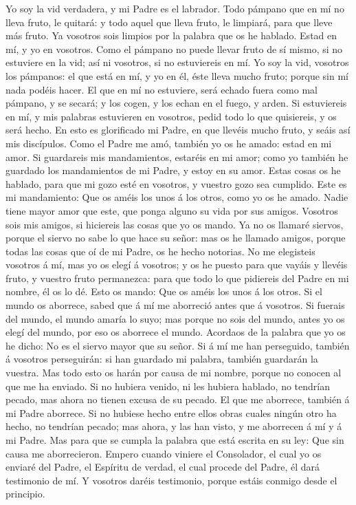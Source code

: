  Yo soy la vid verdadera, y mi Padre es el labrador.
 Todo pámpano que en mí no lleva fruto, le quitará: y todo
aquel que lleva fruto, le limpiará, para que lleve más fruto.
 Ya vosotros sois limpios por la palabra que os he
hablado.  Estad en mí, y yo en vosotros. Como el pámpano
no puede llevar fruto de sí mismo, si no estuviere en la vid; así ni
vosotros, si no estuviereis en mí.  Yo soy la vid,
vosotros los pámpanos: el que está en mí, y yo en él, éste lleva mucho
fruto; porque sin mí nada podéis hacer.  El que en mí no
estuviere, será echado fuera como mal pámpano, y se secará; y los cogen,
y los echan en el fuego, y arden.  Si estuviereis en mí, y
mis palabras estuvieren en vosotros, pedid todo lo que quisiereis, y os
será hecho.  En esto es glorificado mi Padre, en que
llevéis mucho fruto, y seáis así mis discípulos.  Como el
Padre me amó, también yo os he amado: estad en mi amor. 
Si guardareis mis mandamientos, estaréis en mi amor; como yo también he
guardado los mandamientos de mi Padre, y estoy en su amor.
 Estas cosas os he hablado, para que mi gozo esté en
vosotros, y vuestro gozo sea cumplido.  Este es mi
mandamiento: Que os améis los unos á los otros, como yo os he amado.
 Nadie tiene mayor amor que este, que ponga alguno su
vida por sus amigos.  Vosotros sois mis amigos, si
hiciereis las cosas que yo os mando.  Ya no os llamaré
siervos, porque el siervo no sabe lo que hace su señor: mas os he
llamado amigos, porque todas las cosas que oí de mi Padre, os he hecho
notorias.  No me elegisteis vosotros á mí, mas yo os
elegí á vosotros; y os he puesto para que vayáis y llevéis fruto, y
vuestro fruto permanezca: para que todo lo que pidiereis del Padre en mi
nombre, él os lo dé.  Esto os mando: Que os améis los
unos á los otros.  Si el mundo os aborrece, sabed que á
mí me aborreció antes que á vosotros.  Si fuerais del
mundo, el mundo amaría lo suyo; mas porque no sois del mundo, antes yo
os elegí del mundo, por eso os aborrece el mundo. 
Acordaos de la palabra que yo os he dicho: No es el siervo mayor que su
señor. Si á mí me han perseguido, también á vosotros perseguirán: si han
guardado mi palabra, también guardarán la vuestra.  Mas
todo esto os harán por causa de mi nombre, porque no conocen al que me
ha enviado.  Si no hubiera venido, ni les hubiera
hablado, no tendrían pecado, mas ahora no tienen excusa de su pecado.
 El que me aborrece, también á mi Padre aborrece.
 Si no hubiese hecho entre ellos obras cuales ningún otro
ha hecho, no tendrían pecado; mas ahora, y las han visto, y me aborrecen
á mí y á mi Padre.  Mas para que se cumpla la palabra que
está escrita en su ley: Que sin causa me aborrecieron. 
Empero cuando viniere el Consolador, el cual yo os enviaré del Padre, el
Espíritu de verdad, el cual procede del Padre, él dará testimonio de mí.
 Y vosotros daréis testimonio, porque estáis conmigo
desde el principio.

